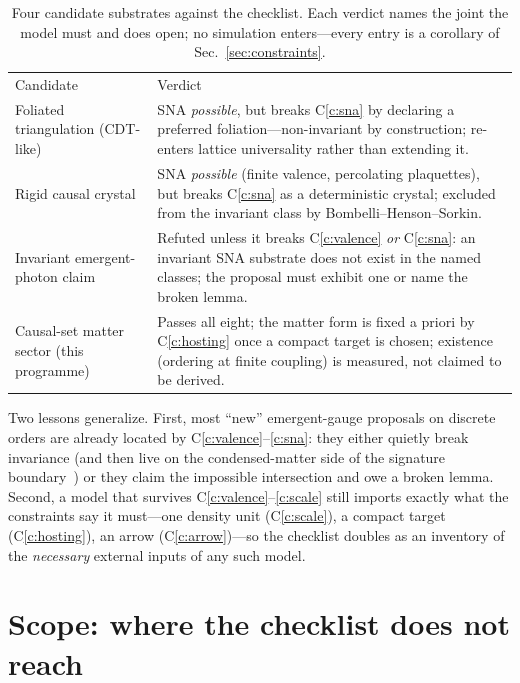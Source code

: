 \documentclass[aps,prd,reprint,nofootinbib,superscriptaddress,floatfix]{revtex4-2}
\begin{document}
\begin{table}[t]
\caption{\label{tab:eval}Four candidate substrates against the checklist. Each verdict names
the joint the model must and does open; no simulation enters---every entry is a corollary of
Sec.~\ref{sec:constraints}.}
\begin{ruledtabular}
\begin{tabular}{p{3.4cm}p{13.2cm}}
Candidate & Verdict \\
\colrule
Foliated triangulation (CDT-like) & SNA \emph{possible}, but breaks C\ref{c:sna} by declaring a
preferred foliation---non-invariant by construction; re-enters lattice universality rather than
extending it. \\
Rigid causal crystal & SNA \emph{possible} (finite valence, percolating plaquettes), but breaks
C\ref{c:sna} as a deterministic crystal; excluded from the invariant class by
Bombelli--Henson--Sorkin. \\
Invariant emergent-photon claim & Refuted unless it breaks C\ref{c:valence} \emph{or}
C\ref{c:sna}: an invariant SNA substrate does not exist in the named classes; the proposal must
exhibit one or name the broken lemma. \\
Causal-set matter sector (this programme) & Passes all eight; the matter form is fixed a priori
by C\ref{c:hosting} once a compact target is chosen; existence (ordering at finite coupling) is
measured, not claimed to be derived. \\
\end{tabular}
\end{ruledtabular}
\end{table}

Two lessons generalize. First, most ``new'' emergent-gauge proposals on discrete orders are
already located by C\ref{c:valence}--\ref{c:sna}: they either quietly break invariance (and
then live on the condensed-matter side of the signature boundary~\cite{WenComplement}) or they
claim the impossible intersection and owe a broken lemma. Second, a model that survives
C\ref{c:valence}--\ref{c:scale} still imports exactly what the constraints say it must---one
density unit (C\ref{c:scale}), a compact target (C\ref{c:hosting}), an arrow (C\ref{c:arrow})---so
the checklist doubles as an inventory of the \emph{necessary} external inputs of any such model.

\section{Scope: where the checklist does not reach}
\label{sec:scope}
\end{document}
